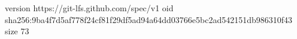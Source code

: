 version https://git-lfs.github.com/spec/v1
oid sha256:9ba4f7d5af778f24cf81f29df5ad94a64dd03766e5bc2ad542151db986310f43
size 73

